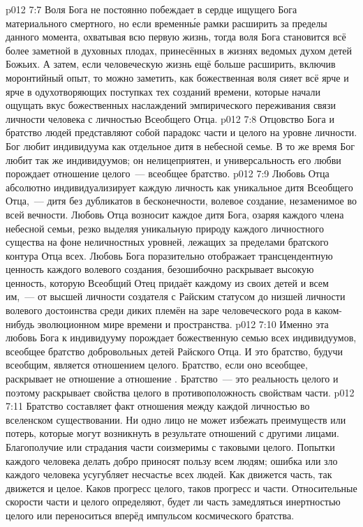 \vs p012 7:7 \pc Воля Бога не постоянно побеждает в сердце ищущего Бога материального смертного, но если временн\'ые рамки расширить за пределы данного момента, охватывая всю первую жизнь, тогда воля Бога становится всё более заметной в духовных плодах, принесённых в жизнях ведомых духом детей Божьих. А затем, если человеческую жизнь ещё больше расширить, включив моронтийный опыт, то можно заметить, как божественная воля сияет всё ярче и ярче в одухотворяющих поступках тех созданий времени, которые начали ощущать вкус божественных наслаждений эмпирического переживания связи личности человека с личностью Всеобщего Отца.
\vs p012 7:8 Отцовство Бога и братство людей представляют собой парадокс части и целого на уровне личности. Бог любит  индивидуума как отдельное дитя в небесной семье. В то же время Бог любит так же  индивидуумов; он нелицеприятен, и универсальность его любви порождает отношение целого~--- всеобщее братство.
\vs p012 7:9 Любовь Отца абсолютно индивидуализирует каждую личность как уникальное дитя Всеобщего Отца,~--- дитя без дубликатов в бесконечности, волевое создание, незаменимое во всей вечности. Любовь Отца возносит каждое дитя Бога, озаряя каждого члена небесной семьи, резко выделяя уникальную природу каждого личностного существа на фоне неличностных уровней, лежащих за пределами братского контура Отца всех. Любовь Бога поразительно отображает трансцендентную ценность каждого волевого создания, безошибочно раскрывает высокую ценность, которую Всеобщий Отец придаёт каждому из своих детей и всем им,~--- от высшей личности создателя с Райским статусом до низшей личности волевого достоинства среди диких племён на заре человеческого рода в каком\hyp{}нибудь эволюционном мире времени и пространства.
\vs p012 7:10 Именно эта любовь Бога к индивидууму порождает божественную семью всех индивидуумов, всеобщее братство добровольных детей Райского Отца. И это братство, будучи всеобщим, является отношением целого. Братство, если оно всеобщее, раскрывает не отношение  а отношение . Братство~--- это реальность целого и поэтому раскрывает свойства целого в противоположность свойствам части.
\vs p012 7:11 Братство составляет факт отношения между каждой личностью во вселенском существовании. Ни одно лицо не может избежать преимуществ или потерь, которые могут возникнуть в результате отношений с другими лицами. Благополучие или страдания части соизмеримы с таковыми целого. Попытки каждого человека делать добро приносят пользу всем людям; ошибка или зло каждого человека усугубляет несчастье всех людей. Как движется часть, так движется и целое. Каков прогресс целого, таков прогресс и части. Относительные скорости части и целого определяют, будет ли часть замедляться инертностью целого или переноситься вперёд импульсом космического братства.
